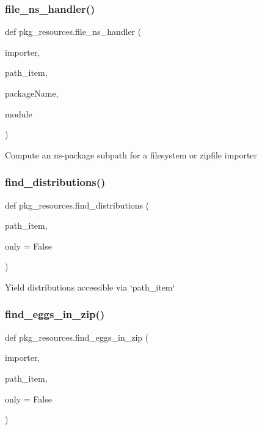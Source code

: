 \subsubsection{\texorpdfstring{file\+\_\+ns\+\_\+handler()}{file\_ns\_handler()}}
{\footnotesize\ttfamily def pkg\+\_\+resources.\+file\+\_\+ns\+\_\+handler (\begin{DoxyParamCaption}\item[{}]{importer,  }\item[{}]{path\+\_\+item,  }\item[{}]{package\+Name,  }\item[{}]{module }\end{DoxyParamCaption})}

\begin{DoxyVerb}Compute an ns-package subpath for a filesystem or zipfile importer\end{DoxyVerb}
 \mbox{\label{namespacepkg__resources_aeade0feaa17d259fd4a7bfa8f8c7383f}} 
\subsubsection{\texorpdfstring{find\+\_\+distributions()}{find\_distributions()}}
{\footnotesize\ttfamily def pkg\+\_\+resources.\+find\+\_\+distributions (\begin{DoxyParamCaption}\item[{}]{path\+\_\+item,  }\item[{}]{only = {\ttfamily False} }\end{DoxyParamCaption})}

\begin{DoxyVerb}Yield distributions accessible via `path_item`\end{DoxyVerb}
 \mbox{\label{namespacepkg__resources_a36b4f55e7e31b83cee4451daf5966e7f}} 
\subsubsection{\texorpdfstring{find\+\_\+eggs\+\_\+in\+\_\+zip()}{find\_eggs\_in\_zip()}}
{\footnotesize\ttfamily def pkg\+\_\+resources.\+find\+\_\+eggs\+\_\+in\+\_\+zip (\begin{DoxyParamCaption}\item[{}]{importer,  }\item[{}]{path\+\_\+item,  }\item[{}]{only = {\ttfamily False} }\end{DoxyParamCaption})}

